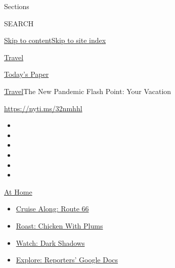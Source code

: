Sections

SEARCH

\protect\hyperlink{site-content}{Skip to
content}\protect\hyperlink{site-index}{Skip to site index}

\href{https://www.nytimes3xbfgragh.onion/section/travel}{Travel}

\href{https://myaccount.nytimes3xbfgragh.onion/auth/login?response_type=cookie\&client_id=vi}{}

\href{https://www.nytimes3xbfgragh.onion/section/todayspaper}{Today's
Paper}

\href{/section/travel}{Travel}\textbar{}The New Pandemic Flash Point:
Your Vacation

\url{https://nyti.ms/32nmhhl}

\begin{itemize}
\item
\item
\item
\item
\item
\item
\end{itemize}

\href{https://www.nytimes3xbfgragh.onion/spotlight/at-home?action=click\&pgtype=Article\&state=default\&region=TOP_BANNER\&context=at_home_menu}{At
Home}

\begin{itemize}
\tightlist
\item
  \href{https://www.nytimes3xbfgragh.onion/2020/09/07/travel/route-66.html?action=click\&pgtype=Article\&state=default\&region=TOP_BANNER\&context=at_home_menu}{Cruise
  Along: Route 66}
\item
  \href{https://www.nytimes3xbfgragh.onion/2020/09/04/dining/sheet-pan-chicken.html?action=click\&pgtype=Article\&state=default\&region=TOP_BANNER\&context=at_home_menu}{Roast:
  Chicken With Plums}
\item
  \href{https://www.nytimes3xbfgragh.onion/2020/09/04/arts/television/dark-shadows-stream.html?action=click\&pgtype=Article\&state=default\&region=TOP_BANNER\&context=at_home_menu}{Watch:
  Dark Shadows}
\item
  \href{https://www.nytimes3xbfgragh.onion/interactive/2020/at-home/even-more-reporters-editors-diaries-lists-recommendations.html?action=click\&pgtype=Article\&state=default\&region=TOP_BANNER\&context=at_home_menu}{Explore:
  Reporters' Google Docs}
\end{itemize}

